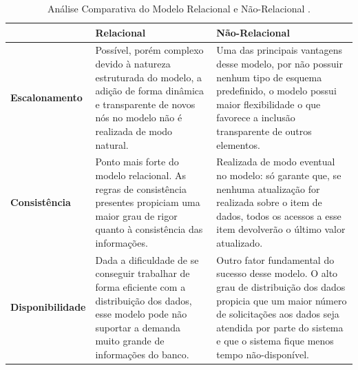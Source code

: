 \begin{table}[!t]
\label{comparativo}
\centering
\caption{Análise Comparativa do Modelo Relacional e Não-Relacional \cite{brito2010bancos}.}
\begin{tabular}{p{3.5cm}|p{5cm}|p{5cm}}
\hline
 & \textbf{Relacional} & \textbf{Não-Relacional} \\ 
\hline                               
\textbf{Escalonamento} & Possível, porém complexo devido à natureza estruturada do modelo, a adição de forma dinâmica e transparente de novos nós no modelo não é realizada de modo natural. & Uma das principais vantagens desse modelo, por não possuir nenhum tipo de esquema predefinido, o modelo possui maior flexibilidade o que favorece a inclusão transparente de outros elementos. \\
\hline
\textbf{Consistência} & Ponto mais forte do modelo relacional. As regras de consistência presentes propiciam uma maior grau de rigor quanto à consistência das informações. & Realizada de modo eventual no modelo: só garante que, se nenhuma atualização for realizada sobre o item de dados, todos os acessos a esse item devolverão o último valor atualizado. \\
\hline
\textbf{Disponibilidade} & Dada a dificuldade de se conseguir trabalhar de forma eficiente com a distribuição dos dados, esse modelo pode não suportar a demanda muito grande de informações do banco. & Outro fator fundamental do sucesso desse modelo. O alto grau de distribuição dos dados propicia que um maior número de solicitações aos dados seja atendida por parte do sistema e que o sistema fique menos tempo não-disponível. \\
\hline

\end{tabular}
\end{table}